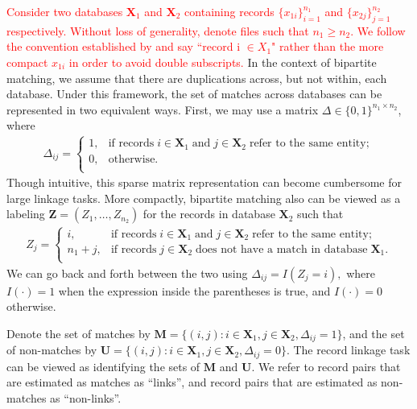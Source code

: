 \documentclass[ba]{imsart}
\begin{document}
\textcolor{red}{Consider two databases $\bm{X}_1$ and $\bm{X}_2$ containing records $\{x_{1i}\}_{i=1}^{n_1}$ and $\{x_{2j}\}_{j=1}^{n_2}$ respectively. Without loss of generality, denote files such that $n_1 \geq n_2$. We follow the convention established by \cite{sadinle_bayesian_2017} and say ``record i $\in X_1$" rather than the more compact $x_{1i}$ in order to avoid double subscripts.} In the context of bipartite matching, we assume that there are duplications across, but not within, each database. Under this framework, the set of matches across databases can be represented in two equivalent ways. First, we may use a matrix $\Delta \in \{0, 1\}^{n_1 \times n_2}$, where
\begin{align}
	\Delta_{ij} =
	\begin{cases}
		1, & \text{if records}\;  i \in \bm{X}_1 \; \text{and}\; j\in \bm{X}_2 \; \text{refer to the same entity}; \\
		0, & \text{otherwise}.\\
	\end{cases}
\end{align}
Though intuitive, this sparse matrix representation can become cumbersome for large linkage tasks. More compactly, bipartite matching also can be viewed as a labeling $\bm{Z} = (Z_1, \ldots, Z_{n_2})$ for the records in database $\bm{X}_2$ such that 
\begin{align}
	Z_{j} =
	\begin{cases}
		i, & \text{if records}\;  i \in \bm{X}_1 \; \text{and}\; j\in \bm{X}_2 \; \text{refer to the same entity}; \\
		n_1 + j, & \text{if records}\;  j \in \bm{X}_2 \; \text{does not have a match in database}\; \bm{X}_1. \\
	\end{cases}
\end{align}
We can go back and forth between the two using $\Delta_{ij} = I(Z_j = i),$ where $I(\cdot) = 1$ when the expression inside the parentheses is true, and $I(\cdot) = 0$ otherwise. 

Denote the set of matches by $\bm{M} = \{(i,j): i \in \bm{X}_1, j \in \bm{X}_2, \Delta_{ij} = 1\}$, and the set of non-matches by 
$\bm{U} =  \{(i,j): i \in \bm{X}_1, j \in \bm{X}_2, \Delta_{ij} = 0\}.$ The record linkage task can be viewed as identifying the sets of  $\bm{M}$ and  $\bm{U}.$ We refer to record pairs that are estimated as matches as ``links'', and record pairs that are estimated as non-matches as ``non-links''.

\end{document}
